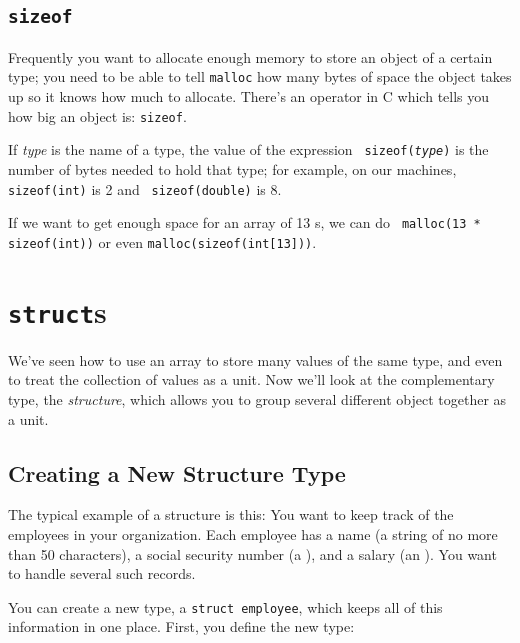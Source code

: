 \subsection{{\tt sizeof}}

Frequently you want to allocate enough memory to store an object of a
certain type; you need to be able to tell {\tt malloc} how many bytes of
space the object takes up so it knows how much to allocate.  There's an
operator in C which tells you how big an object is: {\tt sizeof}. 

If {\em type} is the name of a type, the value of the expression {\tt
sizeof({\em type}\/)} is the number of bytes needed to hold that type;
for example, on our machines, {\tt sizeof(int)} is 2 and {\tt
sizeof(double)} is 8.  

If we want to get enough space for an array of 13 \int s, we can do {\tt
malloc(13 * sizeof(int))} or even {\tt malloc(sizeof(int[13]))}.    

\section{{\tt struct}s}

We've seen how to use an array to store many values of the same type,
and even to treat the collection of values as a unit.  Now we'll look at
the complementary type, the {\em structure}\/, which allows you to group
several different object together as a unit.

\subsection{Creating a New Structure Type}

The typical example of a structure is this:  You want to keep track of
the employees in your organization.  Each employee has a name (a string
of no more than 50 characters), a social security number (a \longint),
and a salary (an \int).  You want to handle several such records.

You can create a new type, a {\tt struct employee}, which keeps all of
this information in one place.  First, you define the new type:

\begin{flushleft}
\verb% struct employee {% \\*
\verb%   char name[50];% \\*
\verb%   long int ssn;% \\*
\verb%   int salary;% \\*
\verb%} ; % 
\end{flushleft}

